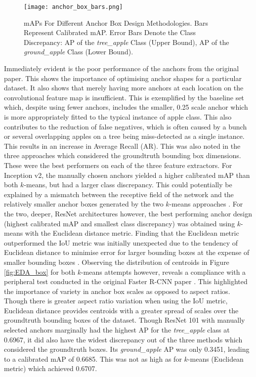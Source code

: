 \documentclass[journal]{IEEEtran}
\begin{document}
\begin{figure}[H]
    \centering
    \texttt{[image: anchor\_box\_bars.png]}
    \caption{mAPs For Different Anchor Box Design Methodologies. Bars Represent Calibrated mAP. Error Bars Denote the Class Discrepancy: AP of the \textit{tree\_apple} Class (Upper Bound), AP of the \textit{ground\_apple} Class (Lower Bound).}
    \label{fig:anchor_box_bars}
\end{figure}

Immediately evident is the poor performance of the anchors from the original paper. This shows the importance of optimising anchor shapes for a particular dataset. It also shows that merely having more anchors at each location on the convolutional feature map is insufficient. This is exemplified by the baseline set which, despite using fewer anchors, includes the smaller, 0.25 scale anchor which is more appropriately fitted to the typical instance of apple class. This also contributes to the reduction of false negatives, which is often caused by a bunch or several overlapping apples on a tree being miss-detected as a single instance. This results in an increase in Average Recall (AR). This was also noted in the three approaches which considered the groundtruth bounding box dimensions. These were the best performers on each of the three feature extractors. For Inception v2, the manually chosen anchors yielded a higher calibrated mAP than both $k$-means, but had a larger class discrepancy. This could potentially be explained by a mismatch between the receptive field of the network and the relatively smaller anchor boxes generated by the two $k$-means approaches \cite{receptivefield}. For the two, deeper, ResNet architectures however, the best performing anchor design (highest calibrated mAP and smallest class discrepancy) was obtained using $k$-means with the Euclidean distance metric. Finding that the Euclidean metric outperformed the IoU metric was initially unexpected due to the tendency of Euclidean distance to minimise error for larger bounding boxes at the expense of smaller bounding boxes \cite{yolov2}. Observing the distribution of centroids in Figure \ref{fig:EDA_box} for both $k$-means attempts however, reveals a compliance with a peripheral test conducted in the original Faster R-CNN paper \cite{fasterrcnn}. This highlighted the importance of variety in anchor box scales as opposed to aspect ratios. Though there is greater aspect ratio variation when using the IoU metric, Euclidean distance provides centroids with a greater spread of scales over the groundtruth bounding boxes of the dataset. Though ResNet 101 with manually selected anchors marginally had the highest AP for the \textit{tree\_apple} class at 0.6967, it did also have the widest discrepancy out of the three methods which considered the groundtruth boxes. Its \textit{ground\_apple} AP was only 0.3451, leading to a calibrated mAP of 0.6685. This was not as high as for $k$-means (Euclidean metric) which achieved 0.6707. 
\end{document}
